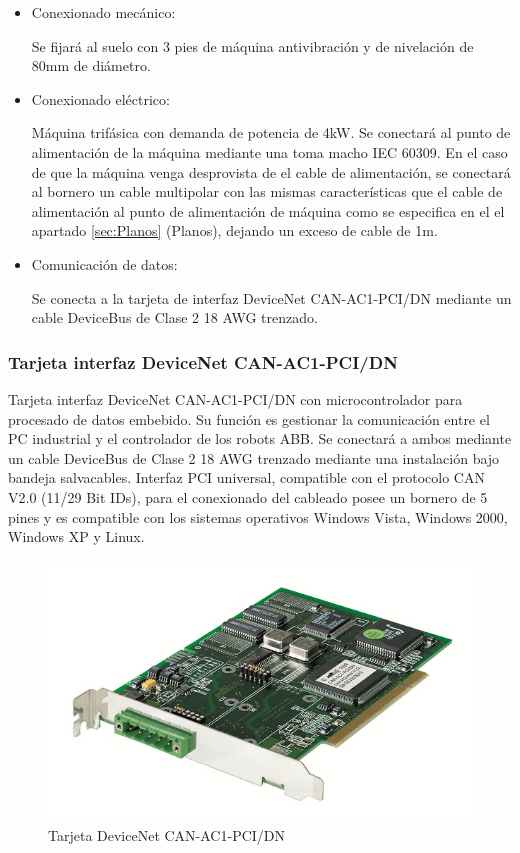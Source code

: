 		\begin{itemize}
				\item{Conexionado mecánico:}
				
				Se fijará al suelo con 3 pies de máquina antivibración y de nivelación de 80mm de diámetro.

				\item{Conexionado eléctrico:}

				Máquina trifásica con demanda de potencia de 4kW. Se conectará al punto de alimentación de la máquina mediante una  toma macho IEC 60309. En el caso de que la máquina venga desprovista de el cable de alimentación, se conectará al bornero un cable multipolar con las mismas características que el cable de alimentación al punto de alimentación de máquina como se especifica en el el apartado \ref{sec:Planos} (Planos), dejando un exceso de cable de 1m. \	
							
				\item{Comunicación de datos:}

				Se conecta a la tarjeta de interfaz DeviceNet CAN-AC1-PCI/DN mediante un cable DeviceBus de Clase 2 18 AWG trenzado.
		\end{itemize}
\newpage

	\subsubsection{Tarjeta interfaz DeviceNet CAN-AC1-PCI/DN}

	
		Tarjeta interfaz DeviceNet CAN-AC1-PCI/DN con microcontrolador para procesado de datos embebido. Su función es gestionar la comunicación entre el PC industrial y el controlador de los robots ABB. Se conectará a ambos mediante un cable DeviceBus de Clase 2 18 AWG trenzado mediante una instalación bajo bandeja salvacables. Interfaz PCI universal, compatible con el protocolo CAN V2.0 (11/29 Bit IDs), para el conexionado del cableado posee un bornero de 5 pines y es  compatible con los sistemas operativos Windows Vista, Windows 2000, Windows XP y Linux.\\

		\begin{figure}[htp]
			\centering
			\includegraphics[width=1\textwidth]{Datasheets/10aFoto.jpg}
			\caption{Tarjeta DeviceNet CAN-AC1-PCI/DN}
			\label{fig:testa}
	\end{figure}

